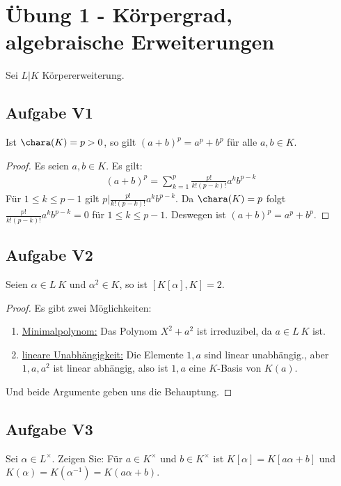 
\section*{Übung 1 - Körpergrad, algebraische Erweiterungen}
Sei $L \vert K$ Körpererweiterung.
\subsection*{Aufgabe V1}
Ist $\chara(K) = p >0$, so gilt $(a+b)^p = a^p + b^p$ für alle $a,b \in K$.
\begin{proof}
	Es seien $a,b \in K$. Es gilt:
	\begin{align*}
		(a+b)^p = \sum_{k=1}^p \frac{p!}{k! (p-k)!}a^k b^{p-k}
	\end{align*}
	Für $1 \le k \le p-1$ gilt $p \vert \frac{p!}{k! (p-k)!}a^k b^{p-k}$. Da $\chara(K) = p$ folgt $\frac{p!}{k! (p-k)!}a^k b^{p-k} = 0$ für $1 \le k \le p-1$. Deswegen ist $(a+b)^p = a^p + b^p$.
\end{proof}

\subsection*{Aufgabe V2}
Seien $\alpha \in L \ K$ und $\alpha^2 \in K$, so ist $[K[\alpha], K] = 2$. 
\begin{proof}
	Es gibt zwei Möglichkeiten:
	\begin{enumerate}
		\item \ul{Minimalpolynom:} Das Polynom $X^2+a^2$ ist irreduzibel, da $a \in L \ K$ ist.
		\item \ul{lineare Unabhängigkeit:} Die Elemente $1,a$ sind linear unabhängig., aber $1,a,a^2$ ist linear abhängig, also ist $1,a$ eine $K$-Basis von $K(a)$.
	\end{enumerate}
	Und beide Argumente geben uns die Behauptung.
\end{proof}

\subsection*{Aufgabe V3}\label{sec_V3}
Sei $\alpha \in L^{\times}$. Zeigen Sie: Für $a \in K^{\times}$ und $b \in K^{\times}$ ist $K[\alpha] = K[a\alpha + b]$ und $K(\alpha) = K(\alpha^{-1}) = K(a\alpha + b)$.

